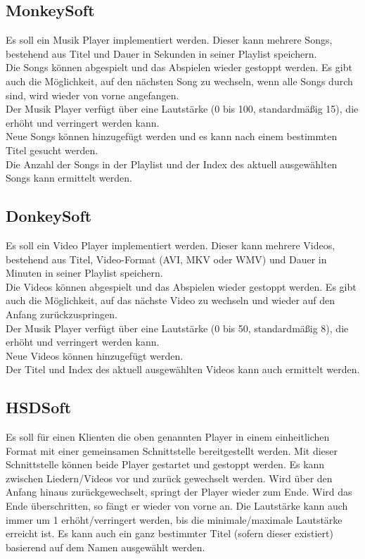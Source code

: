 \subsection{MonkeySoft}
Es soll ein Musik Player implementiert werden. Dieser kann mehrere Songs, bestehend aus Titel und Dauer in Sekunden in seiner Playlist speichern.\\
Die Songs können abgespielt und das Abspielen wieder gestoppt werden. Es gibt auch die Möglichkeit, auf den nächsten Song zu wechseln, wenn alle Songs durch sind, wird wieder von vorne angefangen.\\
Der Musik Player verfügt über eine Lautstärke (0 bis 100, standardmäßig 15), die erhöht und verringert werden kann.\\
Neue Songs können hinzugefügt werden und es kann nach einem bestimmten Titel gesucht werden.\\
Die Anzahl der Songs in der Playlist und der Index des aktuell ausgewählten Songs kann ermittelt werden.

\subsection{DonkeySoft}
Es soll ein Video Player implementiert werden. Dieser kann mehrere Videos, bestehend aus Titel, Video-Format (AVI, MKV oder WMV) und Dauer in Minuten in seiner Playlist speichern.\\
Die Videos können abgespielt und das Abspielen wieder gestoppt werden. Es gibt auch die Möglichkeit, auf das nächste Video zu wechseln und wieder auf den Anfang zurückzuspringen.\\
Der Musik Player verfügt über eine Lautstärke (0 bis 50, standardmäßig 8), die erhöht und verringert werden kann.\\
Neue Videos können hinzugefügt werden.\\
Der Titel und Index des aktuell ausgewählten Videos kann auch ermittelt werden.

\subsection{HSDSoft}
Es soll für einen Klienten die oben genannten Player in einem einheitlichen Format mit einer gemeinsamen Schnittstelle bereitgestellt werden. Mit dieser Schnittstelle können beide Player gestartet und gestoppt werden. Es kann zwischen Liedern/Videos vor und zurück gewechselt werden. Wird über den Anfang hinaus zurückgewechselt, springt der Player wieder zum Ende. Wird das Ende überschritten, so fängt er wieder von vorne an. Die Lautstärke kann auch immer um 1 erhöht/verringert werden, bis die minimale/maximale Lautstärke erreicht ist. Es kann auch ein ganz bestimmter Titel (sofern dieser existiert) basierend auf dem Namen ausgewählt werden.\\

